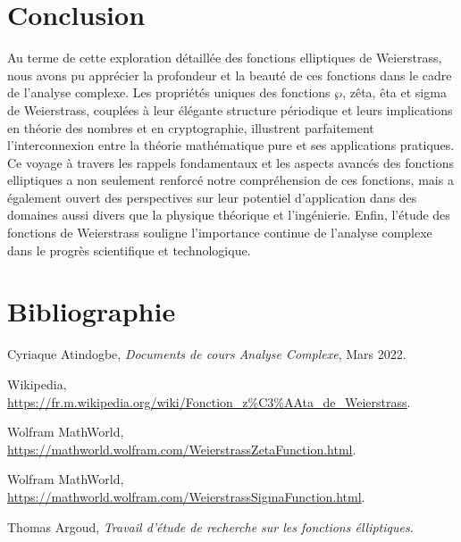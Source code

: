 \documentclass[12pt]{article}
\begin{document}
                        \newpage
                        \section*{Conclusion}

            Au terme de cette exploration détaillée des fonctions elliptiques de Weierstrass, nous avons pu apprécier la profondeur et la beauté de ces
            fonctions dans le cadre de l'analyse complexe. Les propriétés uniques des fonctions $\wp$, zêta, êta et sigma de Weierstrass, couplées à leur élégante
            structure périodique et leurs implications en théorie des nombres et en cryptographie, illustrent parfaitement l'interconnexion entre la théorie
            mathématique pure et ses applications pratiques. Ce voyage à travers les rappels fondamentaux et les aspects avancés des fonctions elliptiques a
            non seulement renforcé notre compréhension de ces fonctions, mais a également ouvert des perspectives sur leur potentiel d'application dans des
            domaines aussi divers que la physique théorique et l'ingénierie. Enfin, l'étude des fonctions de Weierstrass souligne l'importance continue de
            l'analyse complexe dans le progrès scientifique et technologique.
            \newpage
            \section*{Bibliographie}

            \begin{thebibliography}{9}

            	Cyriaque Atindogbe, \textit{Documents de cours Analyse Complexe}, Mars 2022.

            	Wikipedia, \url{https://fr.m.wikipedia.org/wiki/Fonction_z%C3%AAta_de_Weierstrass}.

            	Wolfram MathWorld, \url{https://mathworld.wolfram.com/WeierstrassZetaFunction.html}.

            	Wolfram MathWorld, \url{https://mathworld.wolfram.com/WeierstrassSigmaFunction.html}.

            	Thomas Argoud, \textit{Travail d'étude de recherche sur les fonctions élliptiques}.

            \end{thebibliography}
\end{document}
